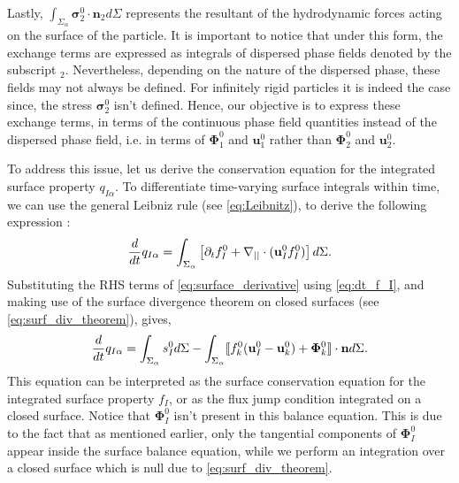 Lastly, $\int_{\Sigma_\alpha} \bm{\sigma}_2^0\cdot\textbf{n}_2 d\Sigma$ represents the resultant of the hydrodynamic forces acting on the surface of the particle.
It is important to notice that under this form, the exchange terms are expressed as integrals of dispersed phase fields denoted by the subscript $_2$.
Nevertheless, depending on the nature of the dispersed phase, these fields may not always be defined.
For infinitely rigid particles it is indeed the case since, the stress $\bm{\sigma}_2^0$ isn't defined.  
Hence, our objective is to express these exchange terms, in terms of the continuous phase field quantities instead of the dispersed phase field, i.e. in terms of $\mathbf{\Phi}_1^0$ and $\textbf{u}_1^0$ rather than $\mathbf{\Phi}_2^0$ and $\textbf{u}_2^0$. 

To address this issue, let us derive the conservation equation for the integrated surface property $q_{I\alpha}$.
To differentiate time-varying surface integrals within time, we can use the general Leibniz rule (see \ref{eq:Leibnitz}), to derive the following expression :
\begin{equation}
    \frac{d}{d t}  q_{I\alpha}
    = \int_{\Sigma_\alpha} \left[
        \partial_t f_I^0
        +   \mathbf{\nabla}_{||} \cdot (\textbf{u}_I^0f_I^0)
    \right]d\Sigma.
    \label{eq:surface_derivative}
\end{equation}
Substituting the RHS terms of \ref{eq:surface_derivative} using \ref{eq:dt_f_I}, and making use of the surface divergence theorem on closed surfaces (see \ref{eq:surf_div_theorem}), gives,
\begin{equation}
    \frac{d}{d t}  q_{I\alpha}
    = \int_{\Sigma_\alpha} 
        s_I^0
    d\Sigma
    - \int_{\Sigma_\alpha} \llbracket 
        f_k^0 (\textbf{u}_I^0 - \textbf{u}_k^0)
        + \mathbf{\Phi}_k^0
     \rrbracket \cdot \textbf{n}
    d\Sigma.
    \label{eq:dt_q_I_alpha}
\end{equation}
This equation can be interpreted as the surface conservation equation for the integrated surface property $f_I$, or as the flux jump condition integrated on a closed surface. 
Notice that $\bm{\Phi}_{I}^0$ isn't present in this balance equation. 
This is due to the fact that as mentioned earlier, only the tangential components of $\bm{\Phi}_{I}^0$ appear inside the surface balance equation, while we perform an integration over a closed surface which is null due to \ref{eq:surf_div_theorem}. 

